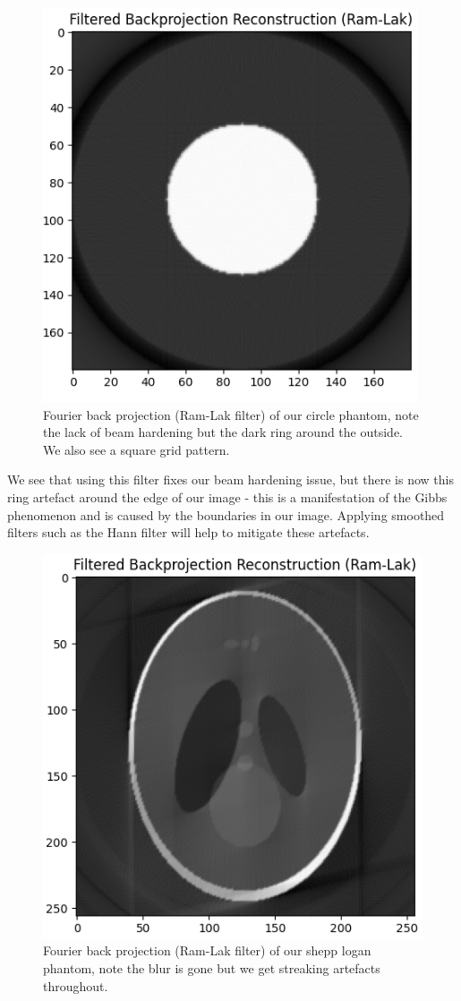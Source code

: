 \documentclass{article}
\theoremstyle{definition}
\begin{document}
\begin{figure}[H]
	\includegraphics[scale=0.7]{fbpcircle.png}
	\caption{Fourier back projection (Ram-Lak filter) of our circle phantom, note the lack of beam hardening but the dark ring around the outside. We also see a square grid pattern.}
\end{figure}

We see that using this filter fixes our beam hardening issue, but there is now this ring artefact around the edge of our image - this is a manifestation of the Gibbs phenomenon \cite{RadiopaediaGibbs} and is caused by the boundaries in our image. Applying smoothed filters such as the Hann filter will help to mitigate these artefacts.

\begin{figure}[H]
	\includegraphics[scale=0.7]{fbpshepp.png}
	\caption{Fourier back projection (Ram-Lak filter) of our shepp logan phantom, note the blur is gone but we get streaking artefacts throughout.}
\end{figure}
\end{document}
